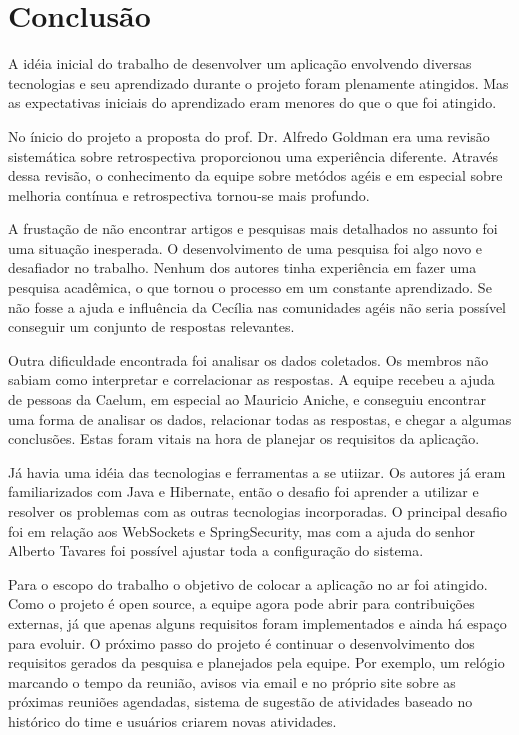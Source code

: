 \section{Conclusão}

A idéia inicial do trabalho de desenvolver um aplicação envolvendo diversas tecnologias e seu aprendizado durante o projeto foram plenamente atingidos. Mas as expectativas iniciais do aprendizado eram menores do que o que foi atingido.

No ínicio do projeto a proposta do prof. Dr. Alfredo Goldman era uma revisão sistemática sobre retrospectiva proporcionou uma experiência diferente. Através dessa revisão, o conhecimento da equipe sobre metódos agéis e em especial sobre melhoria contínua e retrospectiva tornou-se mais profundo.

A frustação de não encontrar artigos e pesquisas mais detalhados no assunto foi uma situação inesperada. O desenvolvimento de uma pesquisa foi algo novo e desafiador no trabalho. Nenhum dos autores tinha experiência em fazer uma pesquisa acadêmica, o que tornou o processo em um constante aprendizado. Se não fosse a ajuda e influência da Cecília nas comunidades agéis não seria possível conseguir um conjunto de respostas relevantes.

Outra dificuldade encontrada foi analisar os dados coletados. Os membros não sabiam como interpretar e correlacionar as respostas. A equipe recebeu a ajuda de pessoas da Caelum, em especial ao Mauricio Aniche, e conseguiu encontrar uma forma de analisar os dados, relacionar todas as respostas, e chegar a algumas conclusões. Estas foram vitais na hora de planejar os requisitos da aplicação.

Já havia uma idéia das tecnologias e ferramentas a se utiizar. Os autores já eram familiarizados com Java e Hibernate, então o desafio foi aprender a utilizar e resolver os problemas com as outras tecnologias incorporadas. O principal desafio foi em relação aos WebSockets e SpringSecurity, mas com a ajuda do senhor Alberto Tavares foi possível ajustar toda a configuração do sistema. 

Para o escopo do trabalho o objetivo de colocar a aplicação no ar foi atingido. Como o projeto é open source, a equipe agora pode abrir para contribuições externas, já que apenas alguns requisitos foram implementados e ainda há espaço para evoluir.  
O próximo passo do projeto é continuar o desenvolvimento dos requisitos gerados da pesquisa e planejados pela equipe. Por exemplo, um relógio marcando o tempo da reunião, avisos via email e no próprio site sobre as próximas reuniões agendadas, sistema de sugestão de atividades baseado no histórico do time e  usuários criarem novas atividades.

